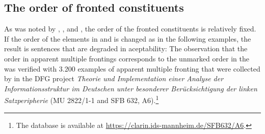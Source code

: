 




\subsection{The order of fronted constituents}
\label{sec-abfolge}

As was noted by \citealp[--7]{Luehr85a}, \citet[--413]{Eisenberg94a}, and \citet[--]{Hoberg97a}, the order of the fronted constituents is relatively fixed. If the order of the
elements in  and  is
changed as in the following examples, the result is sentences that are degraded in aceptability:
\eal
{}
\zl
The observation that the order in apparent multiple frontings corresponds to the unmarked order in
the \mf was verified with 3.200 examples of apparent multiple fronting that were collected by \citet{Bildhauer2011a}
in the DFG project \emph{Theorie und Implementation einer Analyse der Informationsstruktur im
  Deutschen unter besonderer Berücksichtigung der linken Satzperipherie} (MU 2822/1-1 and SFB 632,
A6).\footnote{
  The database is available at \url{https://clarin.ids-mannheim.de/SFB632/A6}.
}



